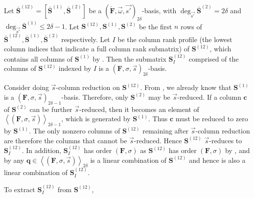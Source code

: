 \begin{lem}
\label{lem:2deltaBasis}Let $\bar{\mathbf{S}}^{\left(12\right)}=[\bar{\mathbf{S}}^{\left(1\right)},\bar{\mathbf{S}}^{\left(2\right)}]$
be a $(\check{\mathbf{F}},\vec{\omega},\vec{s'})_{2\delta}$-basis,
with $\deg_{\vec{s'}}\bar{\mathbf{S}}^{\left(2\right)}=2\delta$ and
$\deg_{\vec{s'}}\bar{\mathbf{S}}^{\left(1\right)}\le2\delta-1$. Let
$\mathbf{S}^{\left(12\right)},\mathbf{S}^{\left(1\right)},\mathbf{S}^{\left(2\right)}$
be the first $n$ rows of $\bar{\mathbf{S}}^{\left(12\right)},\bar{\mathbf{S}}^{\left(1\right)},\bar{\mathbf{S}}^{\left(2\right)}$
respectively. Let $I$ be the column rank profile (the lowest column
indices that indicate a full column rank submatrix) of $\mathbf{S}^{\left(12\right)}$,
which contains all columns of $\mathbf{S}^{\left(1\right)}$ by .
Then the submatrix\textbf{ $\mathbf{S}_{I}^{\left(12\right)}$ }comprised
of the columns of $\mathbf{S}^{\left(12\right)}$ indexed by $I$
is a $\left(\mathbf{F},\sigma,\vec{s}\right)_{2\delta}$-basis. \end{lem}
\begin{pf}
Consider doing $\vec{s}$-column reduction on $\mathbf{S}^{\left(12\right)}$.
From , we already know that $\mathbf{S}^{\left(1\right)}$
is a $\left(\mathbf{F},\sigma,\vec{s}\right)_{2\delta-1}$-basis.
Therefore, only $\mathbf{S}^{\left(2\right)}$ may be $\vec{s}$-reduced.
If a column $\mathbf{c}$ of $\mathbf{S}^{\left(2\right)}$ can be
further $\vec{s}$-reduced, then it becomes an element of $\left\langle \left(\mathbf{F},\sigma,\vec{s}\right)\right\rangle _{2\delta-1}$,
which is generated by $\mathbf{S}^{\left(1\right)}$. Thus $\mathbf{c}$
must be reduced to zero by $\mathbf{S}^{\left(1\right)}$. The only
nonzero columns of $\mathbf{S}^{\left(12\right)}$ remaining after
$\vec{s}$-column reduction are therefore the columns that cannot
be $\vec{s}$-reduced. Hence $\mathbf{S}^{\left(12\right)}$ $\vec{s}$-reduces
to \textbf{$\mathbf{S}_{I}^{\left(12\right)}$}. In addition, \textbf{$\mathbf{S}_{I}^{\left(12\right)}$}
has order $\left(\mathbf{F},\sigma\right)$ as $\mathbf{S}^{\left(12\right)}$
has order $\left(\mathbf{F},\sigma\right)$ by ,
and by  any $\mathbf{q}\in\left\langle \left(\mathbf{F},\sigma,\vec{s}\right)\right\rangle _{2\delta}$
is a linear combination of $\mathbf{S}^{\left(12\right)}$ and hence
is also a linear combination of $\mathbf{S}_{I}^{\left(12\right)}$. 
\end{pf}
To extract $\mathbf{S}_{I}^{\left(12\right)}$ from $\mathbf{S}^{\left(12\right)}$,
